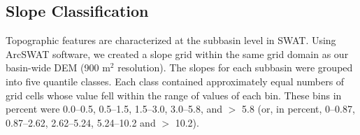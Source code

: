 \subsection{Slope Classification}\label{sec:slope}

Topographic features are characterized at the subbasin level in SWAT. 
Using ArcSWAT software, we created a slope grid within the same grid domain as our basin-wide DEM (900 m$^2$ resolution). 
The slopes for each subbasin were grouped into five quantile classes.
Each class contained approximately equal numbers of grid cells whose value fell within the range of values of each bin. 
These bins in percent were 0.0--0.5, 0.5--1.5, 1.5--3.0, 3.0--5.8, and $>$ 5.8 
(or, in percent, 0--0.87, 0.87--2.62, 2.62--5.24, 5.24--10.2 and $>$ 10.2).